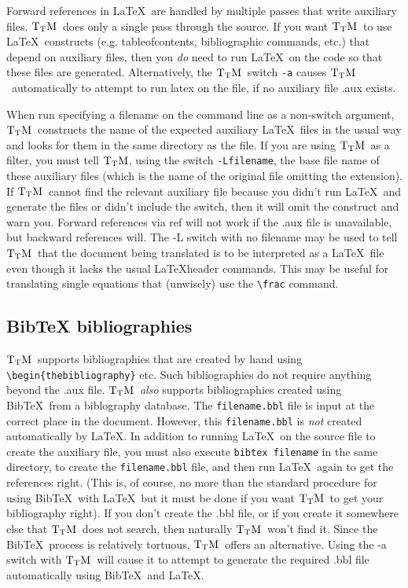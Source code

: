 \documentclass[12pt]{article}
\def\TtM{$\rm{}T_TH$}
\def\TtM{$\rm{}T_TM$}%
\begin{document}
Forward references in \LaTeX\ are handled by multiple passes that write
auxiliary files. \TtM\ does only a single pass through the source.  If
you want \TtM\ to use \LaTeX\ constructs (e.g. tableofcontents,
bibliographic commands, etc.) that depend on auxiliary files, then
you {\em do} need to run \LaTeX\ on the code so that these files are
generated. Alternatively, the \TtM\ switch
\verb+-a+  
causes \TtM\ automatically to attempt to run latex on the file,
if no auxiliary file .aux exists.

When run specifying a filename on the command line as a non-switch
argument, \TtM\ constructs the name of the expected auxiliary \LaTeX\
files in the usual way and looks for them in the same directory as the
file. 
If you are using \TtM\ as a filter, you must tell \TtM, using the
switch \verb!-Lfilename!, the base file name of these auxiliary files
(which is the name of the original file omitting the extension). If
\TtM\ cannot find the relevant auxiliary file because you didn't run
\LaTeX\ and generate the files or didn't include the switch, then it
will omit the construct and warn you.\index{references!forward}
Forward references via ref will not work if the .aux file is
unavailable, but backward references will. The -L switch with no
filename may be used to tell \TtM\ that the document being translated
is to be interpreted as a \LaTeX\ file even though it lacks the usual
\LaTeX header commands. This may be useful for translating single
equations that (unwisely) use the \verb|\frac| command.


\subsection{BibTeX bibliographies\label{bibtex}}

\TtM\ supports bibliographies that are created by hand using
\verb!\begin{thebibliography}! etc. Such bibliographies do not require
anything beyond the .aux file. \TtM\ \emph{also} supports
bibliographies created using Bib\TeX\ from a biblography database. The
\verb!filename.bbl! file is input at the correct place in the
document. However, this \verb!filename.bbl!  is \emph{not} created
automatically by \LaTeX. In addition to running \LaTeX\ on the source
file to create the auxiliary file, you must also execute
\verb!bibtex filename! in the same directory, to create the
\verb!filename.bbl! file, and then run \LaTeX\ again to get the
references right. (This is, of course, no more than the standard
procedure for using Bib\TeX\ with \LaTeX\ but it must be done if you
want \TtM\ to get your bibliography right). If you don't create the
.bbl file, or if you create it somewhere else that \TtM\ does not
search, then naturally \TtM\ won't find it. Since the Bib\TeX\ process
is relatively tortuous, \TtM\ offers an alternative. Using the -a
switch\index{a@-a switch}\index{switches|-a} with \TtM\ will cause it
to attempt to generate the required .bbl file automatically using
Bib\TeX\ and \LaTeX.
\end{document}
